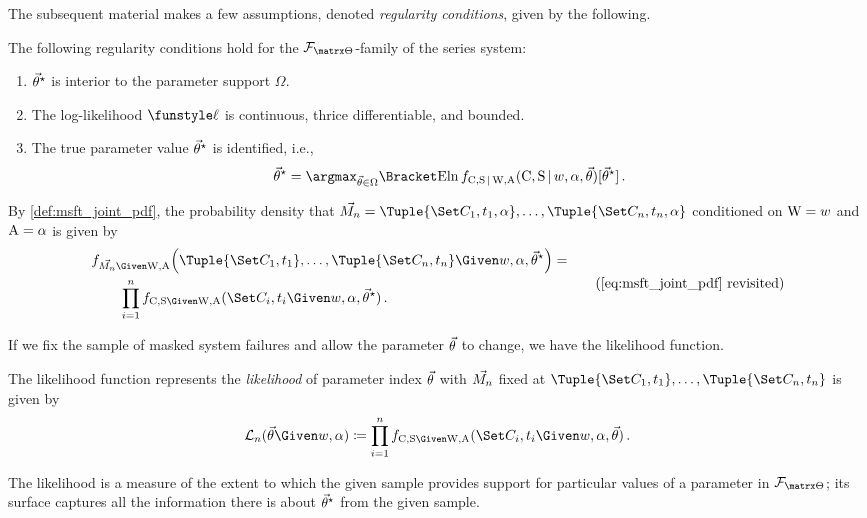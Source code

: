 \documentclass[../main.tex]{subfiles}
\begin{document}
The subsequent material makes a few assumptions, denoted \emph{regularity conditions}, given by the following.
\begin{assumption}
\label{def:reg_cond}
The following regularity conditions hold for the $\pfam$-family of the series system:
\begin{enumerate}
    \item ${\vec{\theta}}^{\star}$ is interior to the parameter support $\Omega$.
    \item The log-likelihood $\Fun{\ell}$ is continuous, thrice differentiable, and bounded.
    \item{
        The true parameter value ${\vec{\theta}}^{\star}$ is identified, i.e.,
        \begin{equation}
            \tparam\sysparamvec = \argmax_{\sysparamvec \in \Omega} \Expect{\ln \pdf_{\rvcand,\sv \given \RV{W},\RV{A}}(\rvcand, \sv \given w, \alpha, \sysparamvec)}[\tparam\sysparamvec]\,.
        \end{equation}
    }
\end{enumerate}
\end{assumption}

By \cref{def:msft_joint_pdf}, the probability density that $\mfs = \Tuple{\cand_1,t_1,\alpha},\ldots,\Tuple{\cand_n,t_n,\alpha}$ conditioned on $\mathrm{W} = w$ and $\mathrm{A} = \alpha$ is given by
\begin{equation*}
\begin{split}
& \pdf_{\mfs \Given \RV{W}, \RV{A}}\!\left(\Tuple{\cand_1,t_1},\ldots,\Tuple{\cand_n,t_n} \Given w, \alpha, \tparam{\sysparamvec}\right) =\\
    & \qquad \prod_{i=1}^{n} \pdf_{\rvcand,\sv \Given \RV{W},\RV{A}}(\cand_i, t_i \Given w, \alpha, \tparam\sysparamvec)\,.
\end{split}
\tag{\ref{eq:msft_joint_pdf} revisited}
\end{equation*}

If we fix the sample of masked system failures and allow the parameter $\vec{\theta}$ to change, we have the likelihood function.
\begin{definition}
\label{def:likelihood_func}
The likelihood function represents the \emph{likelihood} of parameter index $\vec{\theta}$ with $\vec{M_n}$ fixed at $\Tuple{\cand_1,t_1},\ldots,\Tuple{\cand_n,t_n}$ is given by
\begin{equation}
    \likelihood_n(\sysparamvec \Given w, \alpha) \coloneqq \prod_{i=1}^{n} \pdf_{\rvcand, \sv \Given \RV{W}, \RV{A}}(\cand_i, t_i \Given w, \alpha, \sysparamvec)\,.
\end{equation}
\end{definition}
The likelihood is a measure of the extent to which the given sample provides support for particular values of a parameter in $\pfam$;
its surface captures all the information there is about ${\vec{\theta}}^{\star}$ from the given sample.
\end{document}
